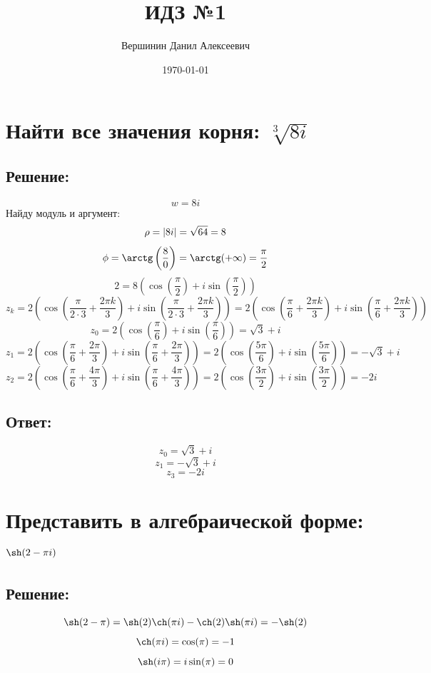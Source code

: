 \documentclass{article}
\title{\vspace{-1cm}ИДЗ №1}
\author{Вершинин Данил Алексеевич}
\date{\today}
\begin{document}
	
	\maketitle
	\section{Найти все значения корня: $\sqrt[3]{8i}$}
	\subsection{Решение:}
	\[w= 8i\]
	Найду модуль и аргумент:
	\[\rho = |8i| = \sqrt{64} = 8 \\ \]
	\[\phi = \arctg\left(\frac{8}{0}\right) = \arctg(+\infty) = \frac{\pi}{2}\]
	\[2 = 8(\cos\left(\frac{\pi}{2}\right) + i \sin\left(\frac{\pi}{2}\right))\]
	\[z_k = 2 \left(\cos\left(\frac{\pi }{2\cdot 3} + \frac{2\pi k}{3}\right) + i \sin\left(\frac{\pi }{2\cdot 3} + \frac{2\pi k}{3}\right)\right) = 2 \left(\cos\left(\frac{\pi }{6} + \frac{2\pi k}{3}\right) + i \sin\left(\frac{\pi }{6} + \frac{2\pi k}{3}\right)\right)\]
	\[z_0 = 2 \left(\cos\left(\frac{\pi}{6}\right) + i \sin\left(\frac{\pi}{6}\right)\right) = \sqrt{3} + i\]
	\[z_1 = 2 \left(\cos\left(\frac{\pi}{6} + \frac{2\pi}{3}\right) + i \sin\left(\frac{\pi}{6} + \frac{2\pi}{3}\right)\right) = 2 \left(\cos\left(\frac{5\pi}{6}\right) + i \sin\left(\frac{5\pi}{6}\right)\right) = - \sqrt{3} + i\]
	\[z_2 = 2 \left(\cos\left(\frac{\pi}{6} + \frac{4\pi}{3}\right) + i \sin\left(\frac{\pi}{6} + \frac{4\pi}{3}\right)\right) = 2 \left(\cos\left(\frac{3\pi}{2}\right) + i \sin\left(\frac{3\pi}{2}\right)\right) = -2i\]
	\subsection{Ответ:}
	\[z_0 = \sqrt{3} + i\]
	\[z_1 = - \sqrt{3} + i\]
	\[z_3 = -2i\]
	
	\section{Представить в алгебраической форме: $\sh(2-\pi i)$}
	\subsection{Решение:}
	\[\sh(2-\pi) = \sh(2)\ch(\pi i) - \ch(2)\sh(\pi i) = -\sh(2)\]
	\[\ch(\pi i) = \cos(\pi) = -1\]
	\[\sh(i\pi) = i \sin(\pi) = 0\]
\end{document}
